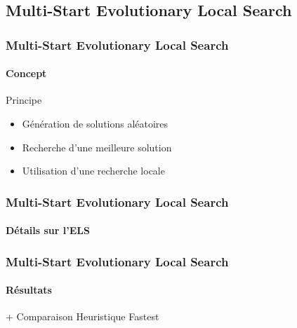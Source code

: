 \subsection{Multi-Start Evolutionary Local Search}
\begin{frame}
	\frametitle{Multi-Start Evolutionary Local Search}
	\framesubtitle{Concept}
	\begin{block}{Principe}
		\begin{itemize}
			\item Génération de solutions aléatoires
			\item Recherche d'une meilleure solution
			\item Utilisation d'une recherche locale
		\end{itemize}
	\end{block}
\end{frame}
\begin{frame}
	\frametitle{Multi-Start Evolutionary Local Search}
	\framesubtitle{Détails sur l'ELS}
	\centering
	\begin{tikzpicture}[scale=.5,transform shape,node distance=1cm]
		
	\end{tikzpicture}
\end{frame}
\begin{frame}
	\frametitle{Multi-Start Evolutionary Local Search}
	\framesubtitle{Résultats}
	+ Comparaison Heuristique Fastest
\end{frame}

